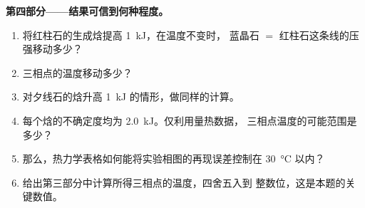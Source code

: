 \begin{problem}
\noindent\textbf{第四部分——结果可信到何种程度。}
\begin{enumerate}[resume]
\item 将红柱石的生成焓提高 \qty{1}{kJ}，在温度不变时，
蓝晶石 $=$ 红柱石这条线的压强移动多少？
\item 三相点的温度移动多少？
\item 对夕线石的焓升高 \qty{1}{kJ} 的情形，做同样的计算。
\item 每个焓的不确定度均为 \qty{2.0}{kJ}。仅利用量热数据，
三相点温度的可能范围是多少？
\item 那么，热力学表格如何能将实验相图的再现误差控制在
\qty{30}{\celsius} 以内？
\item 给出第三部分中计算所得三相点的温度，四舍五入到
整数位，这是本题的关键数值。
\end{enumerate}
\end{problem}
